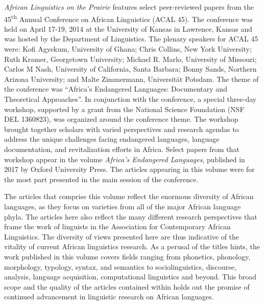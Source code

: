

\textit{African Linguistics on the Prairie} features select peer-reviewed papers from the 45\textsuperscript{th} Annual Conference on African Linguistics (ACAL 45).  The conference was held on April 17-19, 2014 at the University of Kansas in Lawrence, Kansas and was hosted by the Department of Linguistics.  The plenary speakers for ACAL 45 were: Kofi Agyekum, University of Ghana; Chris Collins, New York University; Ruth Kramer, Georgetown University; Michael R. Marlo, University of Missouri; Carlos M Nash, University of California, Santa Barbara; Bonny Sands, Northern Arizona University; and Malte Zimmermann, Universität Potsdam.  The theme of the conference was “Africa’s Endangered Languages: Documentary and Theoretical Approaches”.  In conjunction with the conference, a special three-day workshop, supported by a grant from the National Science Foundation (NSF DEL 1360823), was organized around the conference theme.  The workshop brought together scholars with varied perspectives and research agendas to address the unique challenges facing endangered languages, language documentation, and revitalization efforts in Africa.  Select papers from that workshop appear in the volume \textit{Africa’s Endangered Languages}, published in 2017 by Oxford University Press.  The articles appearing in this volume were for the most part presented in the main session of the conference. 

The articles that comprise this volume reflect the enormous diversity of African languages, as they focus on varieties from all of the major African language phyla.  The articles here also reflect the many different research perspectives that frame the work of linguists in the Association for Contemporary African Linguistics. The diversity of views presented here are thus indicative of the vitality of current African linguistics research. As a perusal of the titles hints, the work published in this volume covers fields ranging from phonetics, phonology, morphology, typology, syntax, and semantics to sociolinguistics, discourse, analysis, language acquisition, computational linguistics and beyond.  This broad scope and the quality of the articles contained within holds out the promise of continued advancement in linguistic research on African languages.

